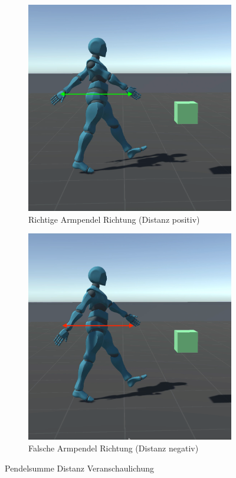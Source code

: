 \begin{figure}[H]
  \centering  
    \begin{subfigure}{.49\textwidth}
      \centering  
      \includegraphics[width=\textwidth]{img/hand_pendel_gut}
      \caption{Richtige Armpendel Richtung (Distanz positiv)}
      \label{fig:hand_pendel_gut}
    \end{subfigure}
    \begin{subfigure}{.49\textwidth}
      \centering  
      \includegraphics[width=\textwidth]{img/hand_pendel_schlecht}
      \caption{Falsche Armpendel Richtung (Distanz negativ)}
      \label{fig:hand_pendel_schlecht}
    \end{subfigure}
  \caption{Pendelsumme Distanz Veranschaulichung}
  \label{fig:pendelsumme_distanz}
\end{figure}

